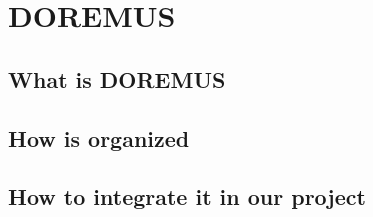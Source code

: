 \chapter{DOREMUS}

\section{What is DOREMUS}

\section{How is organized}

\section{How to integrate it in our project}
